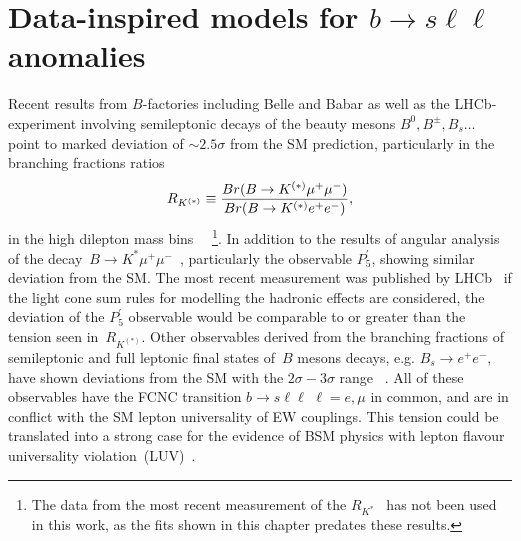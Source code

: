 
\chapter{Data-inspired models for $b \to s \ell \ell$ anomalies}\label{chap:flav}
Recent results from $B$-factories including Belle and Babar as well as the LHCb-experiment involving semileptonic decays of the beauty mesons $B^0, B^\pm,B_s \dots$ point to marked deviation of $ \sim 2.5 \sigma$ from the SM prediction, particularly in the branching fractions ratios
\begin{equation}
R_{K^{(*)}} \equiv {Br(B \to K^{(*)} \mu^{+} \mu^{-}) \over Br(B \to K^{(*)} e^{+} e^{-})},
\end{equation}
in the high dilepton mass bins ~\cite{Aaij:2014ora,Aaij:2017vbb,Aaij:2019wad,Abdesselam:2019wac,LHCb:2021trn}~\footnote{The data from the most recent measurement of the $R_{K^*}$~\cite{LHCb:2021trn} has not been used in this work, as the fits shown in this chapter predates these results.}. In addition to the results of angular analysis of the decay~$B \to K^{*} \mu^{+} \mu^{-}$~\cite{Descotes-Genon:2013wba,Descotes-Genon:2015uva}, particularly the observable $P_5^\prime$,  showing similar deviation from the SM. The most recent measurement was published by LHCb~\cite{LHCb:2020lmf} if the light cone sum rules for modelling the hadronic effects are considered, the deviation of the $P_5^\prime$ observable would be comparable to or greater than the tension seen in~$R_{K^{(*)}}$. Other observables derived from the branching fractions of semileptonic and full leptonic final states of~$B$ mesons decays, e.g. $ B_{s} \to e^{+} e^{-}$, have shown deviations from the SM with the $2\sigma-3\sigma$ range ~\cite{Chatrchyan:2013bka,Aaij:2017vad,Aaboud:2018mst,Aaij:2020nol}. All of these observables have the FCNC transition $ b \to s \ell \ell\, \, \ell = e, \mu$ in common, and are in conflict with the SM lepton universality of EW couplings. This tension could be translated into a strong case for the evidence of BSM physics with lepton flavour universality violation~(LUV)~\cite{Hiller:2014yaa,Hiller:2014ula,Bordone:2016gaq}.\\
